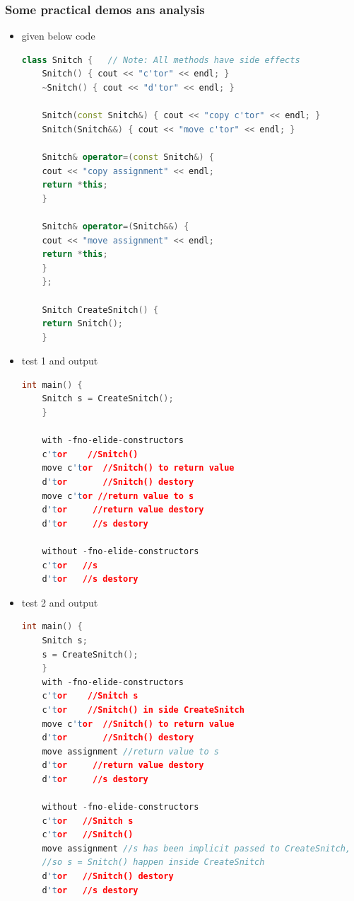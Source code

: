 \documentclass[a4paper,12pt,twoside]{book}
\begin{document}
\subsubsection{Some practical demos ans analysis}
\begin{itemize}
	
	\item given below code
	\begin{lstlisting}[frame=single, language=c++]
	class Snitch {   // Note: All methods have side effects
	Snitch() { cout << "c'tor" << endl; }
	~Snitch() { cout << "d'tor" << endl; }
	
	Snitch(const Snitch&) { cout << "copy c'tor" << endl; }
	Snitch(Snitch&&) { cout << "move c'tor" << endl; }
	
	Snitch& operator=(const Snitch&) {
	cout << "copy assignment" << endl;
	return *this;
	}
	
	Snitch& operator=(Snitch&&) {
	cout << "move assignment" << endl;
	return *this;
	}
	};
	
	Snitch CreateSnitch() {
	return Snitch();
	}
	\end{lstlisting}
	
	\item test 1 and output 
	\begin{lstlisting}[frame=single, language=c++]
	int main() {
	Snitch s = CreateSnitch();
	}
	
	with -fno-elide-constructors
	c'tor    //Snitch()
	move c'tor  //Snitch() to return value
	d'tor       //Snitch() destory
	move c'tor //return value to s
	d'tor     //return value destory
	d'tor     //s destory
	
	without -fno-elide-constructors
	c'tor   //s
	d'tor   //s destory
	\end{lstlisting}
	
	\item test 2 and output
	\begin{lstlisting}[frame=single, language=c++]
	int main() {
	Snitch s;
	s = CreateSnitch();
	}
	with -fno-elide-constructors
	c'tor    //Snitch s
	c'tor    //Snitch() in side CreateSnitch
	move c'tor  //Snitch() to return value
	d'tor       //Snitch() destory
	move assignment //return value to s
	d'tor     //return value destory
	d'tor     //s destory
	
	without -fno-elide-constructors
	c'tor   //Snitch s
	c'tor   //Snitch()
	move assignment //s has been implicit passed to CreateSnitch, 
	//so s = Snitch() happen inside CreateSnitch
	d'tor   //Snitch() destory
	d'tor   //s destory
	\end{lstlisting}
	

\end{itemize}
\end{document}
